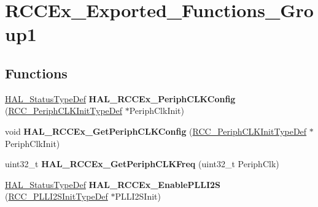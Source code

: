 \hypertarget{group___r_c_c_ex___exported___functions___group1}{}\section{R\+C\+C\+Ex\+\_\+\+Exported\+\_\+\+Functions\+\_\+\+Group1}
\label{group___r_c_c_ex___exported___functions___group1}
\subsection*{Functions}
\begin{DoxyCompactItemize}
\item 
\mbox{\label{group___r_c_c_ex___exported___functions___group1_ga0c0f61a1e2f47cc81bc43d83ba3e0d95}} 
\mbox{\hyperlink{stm32f7xx__hal__def_8h_a63c0679d1cb8b8c684fbb0632743478f}{H\+A\+L\+\_\+\+Status\+Type\+Def}} {\bfseries H\+A\+L\+\_\+\+R\+C\+C\+Ex\+\_\+\+Periph\+C\+L\+K\+Config} (\mbox{\hyperlink{struct_r_c_c___periph_c_l_k_init_type_def}{R\+C\+C\+\_\+\+Periph\+C\+L\+K\+Init\+Type\+Def}} $\ast$Periph\+Clk\+Init)
\item 
\mbox{\label{group___r_c_c_ex___exported___functions___group1_ga754fc5136c63ad52b7c459aafc8a3927}} 
void {\bfseries H\+A\+L\+\_\+\+R\+C\+C\+Ex\+\_\+\+Get\+Periph\+C\+L\+K\+Config} (\mbox{\hyperlink{struct_r_c_c___periph_c_l_k_init_type_def}{R\+C\+C\+\_\+\+Periph\+C\+L\+K\+Init\+Type\+Def}} $\ast$Periph\+Clk\+Init)
\item 
\mbox{\label{group___r_c_c_ex___exported___functions___group1_ga14acaeb88163a6bb0839470b753ba1bd}} 
uint32\+\_\+t {\bfseries H\+A\+L\+\_\+\+R\+C\+C\+Ex\+\_\+\+Get\+Periph\+C\+L\+K\+Freq} (uint32\+\_\+t Periph\+Clk)
\item 
\mbox{\label{group___r_c_c_ex___exported___functions___group1_gab38471af14446e69ac3e299b2e76fd30}} 
\mbox{\hyperlink{stm32f7xx__hal__def_8h_a63c0679d1cb8b8c684fbb0632743478f}{H\+A\+L\+\_\+\+Status\+Type\+Def}} {\bfseries H\+A\+L\+\_\+\+R\+C\+C\+Ex\+\_\+\+Enable\+P\+L\+L\+I2S} (\mbox{\hyperlink{struct_r_c_c___p_l_l_i2_s_init_type_def}{R\+C\+C\+\_\+\+P\+L\+L\+I2\+S\+Init\+Type\+Def}} $\ast$P\+L\+L\+I2\+S\+Init)

\end{DoxyCompactItemize}
